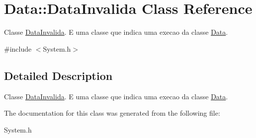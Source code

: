 \hypertarget{class_data_1_1_data_invalida}{}\section{Data\+:\+:Data\+Invalida Class Reference}
\label{class_data_1_1_data_invalida}


Classe \hyperlink{class_data_1_1_data_invalida}{Data\+Invalida}. E uma classe que indica uma execao da classe \hyperlink{class_data}{Data}.  




{\ttfamily \#include $<$System.\+h$>$}



\subsection{Detailed Description}
Classe \hyperlink{class_data_1_1_data_invalida}{Data\+Invalida}. E uma classe que indica uma execao da classe \hyperlink{class_data}{Data}. 

The documentation for this class was generated from the following file\+:\begin{DoxyCompactItemize}
\item 
System.\+h\end{DoxyCompactItemize}
